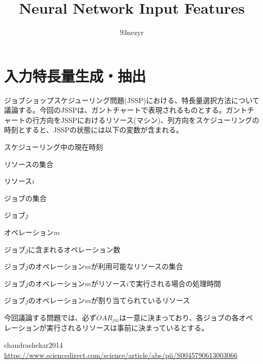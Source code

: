 \documentclass{ltjsarticle}
\begin{document}
\title{Neural Network Input Features}
\author{93nezyr}
\maketitle

\section{入力特長量生成・抽出}

ジョブショップスケジューリング問題(JSSP)における、特長量選択方法について議論する。今回のJSSPは、ガントチャートで表現されるものとする。ガントチャートの行方向をJSSPにおけるリソース(マシン)、列方向をスケジューリングの時刻とすると、JSSPの状態には以下の変数が含まれる。

\begin{description}[style=multiline, leftmargin=10em]
  \item[$t$] スケジューリング中の現在時刻
  \item[$R$] リソースの集合
  \item[$R_i \in R$] リソース$i$
  \item[$J$] ジョブの集合
  \item[$J_j \in J$] ジョブ$j$
  \item[$O_m$] オペレーション$m$
  \item[$ON_{j}$] ジョブ$j$に含まれるオペレーション数
  \item[$OAR_{jm} = \{r \in R\}$] ジョブ$j$のオペレーション$m$が利用可能なリソースの集合
  \item[$PT_{ijm}$] ジョブ$j$のオペレーション$m$がリソース$i$で実行される場合の処理時間
  \item[$OR_{jm} \in R$] ジョブ$j$のオペレーション$m$が割り当てられているリソース
\end{description}

今回議論する問題では、必ず$OAR_{jm}$は一意に決まっており、各ジョブの各オペレーションが実行されるリソースは事前に決まっているとする。

\begin{thebibliography}{99}
   chandrashekar2014 \\
  \url{https://www.sciencedirect.com/science/article/abs/pii/S0045790613003066}

\end{thebibliography}
\end{document}
